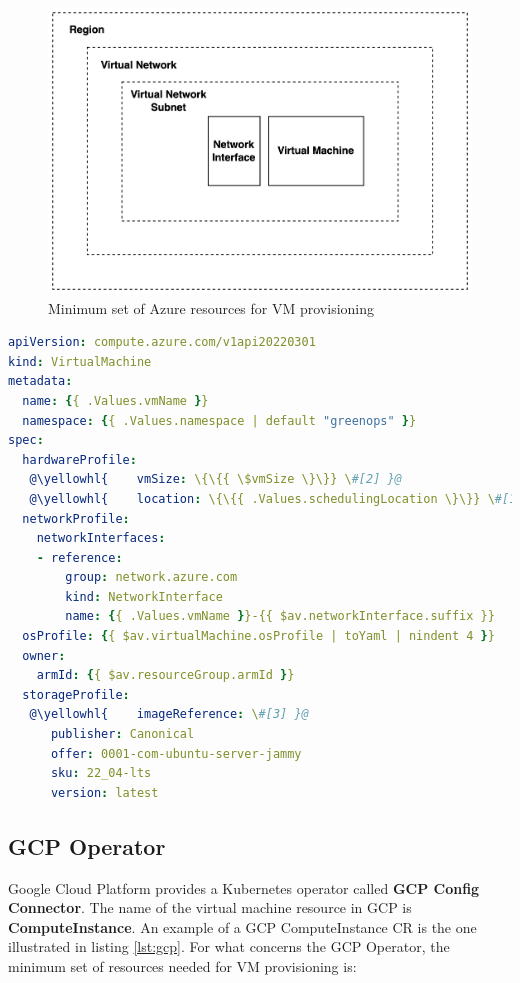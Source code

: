 \begin{figure}[H]
\centering
\includegraphics[width=0.75\linewidth]{images/azure.png}
\caption{Minimum set of Azure resources for VM provisioning}
\label{fig:azure}
\end{figure}

\begin{lstlisting}[language=yaml, caption={Azure VM Custom Resource}, label={lst:azure}]
apiVersion: compute.azure.com/v1api20220301
kind: VirtualMachine
metadata:
  name: {{ .Values.vmName }}
  namespace: {{ .Values.namespace | default "greenops" }}
spec:
  hardwareProfile:
   @\yellowhl{    vmSize: \{\{{ \$vmSize \}\}} \#[2] }@
   @\yellowhl{    location: \{\{{ .Values.schedulingLocation \}\}} \#[1] }@
  networkProfile:
    networkInterfaces:
    - reference:
        group: network.azure.com
        kind: NetworkInterface
        name: {{ .Values.vmName }}-{{ $av.networkInterface.suffix }}
  osProfile: {{ $av.virtualMachine.osProfile | toYaml | nindent 4 }}
  owner:
    armId: {{ $av.resourceGroup.armId }}
  storageProfile:
   @\yellowhl{    imageReference: \#[3] }@
      publisher: Canonical
      offer: 0001-com-ubuntu-server-jammy
      sku: 22_04-lts
      version: latest
\end{lstlisting}

\subsection{GCP Operator}

Google Cloud Platform provides a Kubernetes operator called \textbf{GCP Config Connector}.
The name of the virtual machine resource in GCP is \textbf{ComputeInstance}.
An example of a GCP ComputeInstance CR is the one illustrated in listing \ref{lst:gcp}.
For what concerns the GCP Operator, the minimum set of resources needed for VM provisioning is:

